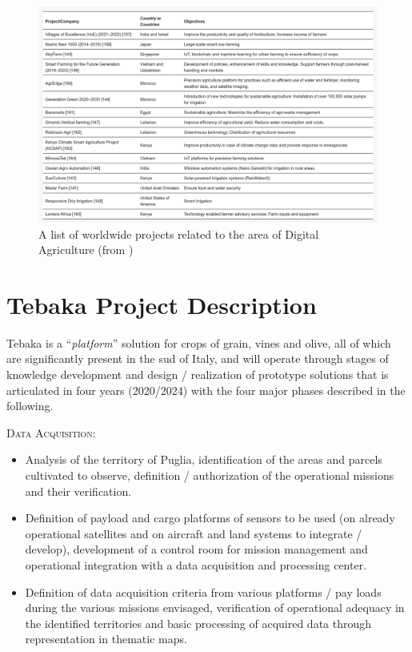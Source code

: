 \documentclass[comsoc,final]{IEEEtran}
\begin{document}
\begin{figure}
    \centering
    \includegraphics[width=\columnwidth]{research-table}
    \caption{A list of worldwide projects related to the area of Digital Agriculture (from \cite{agriengineering4020029})}
    \label{fig:table-worldwide}
\end{figure}


\section{Tebaka Project Description}\label{sec:tebaka}

Tebaka is a “\emph{platform}” solution for crops of grain, vines and olive, all of which are significantly present in the sud of Italy, and will operate through stages of knowledge development and design / realization of prototype solutions that is articulated in four years (2020/2024) with the four major phases described in the following.

\textsc{Data Acquisition:}

\begin{itemize}
\item Analysis of the territory of Puglia, identification of the areas and parcels cultivated to observe, definition / authorization of the operational missions and their verification.
\item Definition of payload and cargo platforms of sensors to be used (on already operational satellites and on aircraft and land systems to integrate / develop), development of a control room for mission management and operational integration with a data acquisition and processing center.
\item Definition of data acquisition criteria from various platforms / pay loads during the various missions envisaged, verification of operational adequacy in the identified territories and basic processing of acquired data through representation in thematic maps.
\end{itemize}
\end{document}
